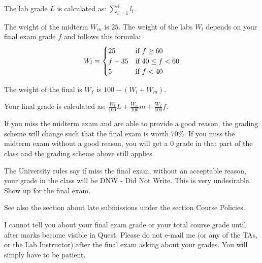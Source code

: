 \documentclass[letterpaper,10pt]{article}
\begin{document}
The lab grade $L$ is calculated as: $\sum_{i=1}^{4}l_{i}$.

The weight of the midterm $W_{m}$ is $25$. The weight of the labs $W_{l}$ depends on your final exam grade $f$ and follows this formula:
\[
 W_{l} = \begin{cases}
        25      & $if~$ f \ge 60\\
        f - 35  & $if~$ 40 \le f < 60\\
        5       & $if~$ f < 40
        \end{cases}
\]

The weight of the final is $W_{f}$ is $100 - (W_{l} + W_{m})$.

Your final grade is calculated as: $\frac{W_{l}}{100}L + \frac{W_{m}}{100}m + \frac{W_{f}}{100}f $.

If you miss the midterm exam and are able to provide a good reason, the grading scheme will change such that the final exam is worth 70\%. If you miss the midterm exam without a good reason, you will get a 0 grade in that part of the class and the grading scheme above still applies.

The University rules say if miss the final exam, without an acceptable reason, your grade in the class will be DNW - Did Not Write. This is very undesirable. Show up for the final exam.

See also the section about late submissions under the section Course Policies.

I cannot tell you about your final exam grade or your total course grade until after marks become visible in Quest. Please do not e-mail me (or any of the TAs, or the Lab Instructor) after the final exam asking about your grades. You will simply have to be patient.


\end{document}
